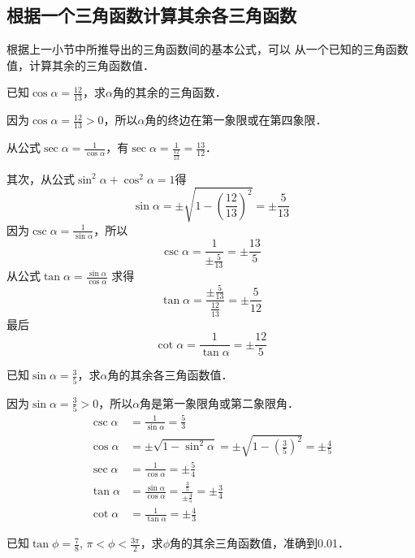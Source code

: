 \subsection{根据一个三角函数计算其余各三角函数}
根据上一小节中所推导出的三角函数间的基本公式，可以
从一个已知的三角函数值，计算其余的三角函数值．

\begin{example}
已知$\cos\alpha=\frac{12}{13}$，求$\alpha$角的其余的三角函数．
\end{example}

\begin{solution}
因为$\cos\alpha=\frac{12}{13}>0$，所以$\alpha$角的终边在第一象限或在第四象限．

从公式$\sec\alpha=\frac{1}{\cos\alpha}$，有$\sec\alpha=\frac{1}{\frac{12}{13}}=\frac{13}{12}$．

其次，从公式$\sin^2\alpha+\cos^2\alpha=1$得
\[\sin\alpha=\pm\sqrt{1-\left(\frac{12}{13}\right)^2}=\pm\frac{5}{13}\]
因为$\csc\alpha=\frac{1}{\sin\alpha}$，所以
\[\csc\alpha=\frac{1}{\pm\frac{5}{13}}=\pm\frac{13}{5}\]
从公式$\tan\alpha=\frac{\sin\alpha}{\cos\alpha}$
求得
\[\tan\alpha=\frac{\pm\frac{5}{13}}{\frac{12}{13}}=\pm\frac{5}{12}\]
最后
\[\cot\alpha=\frac{1}{\tan\alpha}=\pm\frac{12}{5}\]
\end{solution}


\begin{example}
    已知$\sin\alpha=\frac{3}{5}$，求$\alpha$角的其余各三角函数值．
\end{example}
    
\begin{solution}
    因为$\sin\alpha=\frac{3}{5}>0$，所以$\alpha$角是第一象限角或第二象限角．
\[\begin{split}
    \csc\alpha&=\frac{1}{\sin\alpha}=\frac{5}{3}\\
    \cos\alpha&=\pm\sqrt{1-\sin^2\alpha}=\pm\sqrt{1-\left(\frac{3}{5}\right)^2}=\pm\frac{4}{5}\\
    \sec\alpha&=\frac{1}{\cos\alpha}=\pm\frac{5}{4}\\
    \tan\alpha&=\frac{\sin\alpha}{\cos\alpha}=\frac{\frac{3}{5}}{\pm\frac{4}{5}}=\pm\frac{3}{4}\\
    \cot\alpha&=\frac{1}{\tan\alpha}=\pm\frac{4}{3}
\end{split}\]
\end{solution}

\begin{example}
已知$\tan\phi=\frac{7}{8}$, $\pi<\phi<\frac{3\pi}{2}$，求$\phi$角的其余三角函数值，准确到0.01．
\end{example}

